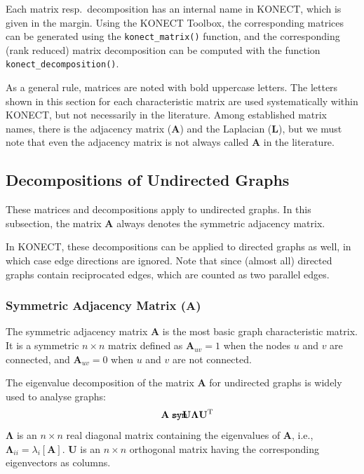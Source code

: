 \documentclass{article}
\def\mathnote#1{%
  \tag*{\rlap{\hspace\marginparsep\smash{\parbox[t]{\marginparwidth}{#1}}}}
}
\begin{document}
Each matrix resp.\ decomposition has an internal name in KONECT, which
is given in the margin.  Using the KONECT Toolbox, the corresponding
matrices can be generated using the \texttt{konect\_matrix()} function,
and the corresponding (rank reduced) matrix decomposition can be
computed with the function \texttt{konect\_decomposition()}. 

As a general rule, matrices are noted with bold uppercase letters.  The
letters shown in this section for each characteristic matrix are used
systematically within KONECT, but not necessarily in the literature.
Among established matrix names, there is the adjacency matrix ($\mathbf
A$) and the Laplacian ($\mathbf L$), but we must note that even the
adjacency matrix is not always called $\mathbf A$ in the literature.

\subsection{Decompositions of Undirected Graphs}
These matrices and decompositions apply to undirected graphs.  In this
subsection, the matrix $\mathbf A$ always denotes the symmetric
adjacency matrix. 

In KONECT, these decompositions can be applied to directed graphs as well, in
which case edge directions are ignored.  Note that since (almost all)
directed graphs contain reciprocated edges, which are counted as two
parallel edges. 

\subsubsection{Symmetric Adjacency Matrix ($\mathbf A$)}
The symmetric adjacency matrix $\mathbf A$ is the most basic graph
characteristic matrix.  It is a symmetric $n \times n$ matrix defined as
$\mathbf A_{uv}=1$ when the nodes $u$ and $v$ are connected, and
$\mathbf A_{uv}=0$ when $u$ and $v$ are not connected. 

The eigenvalue decomposition of the matrix $\mathbf A$ for undirected
graphs is widely used to analyse graphs: 
\begin{align}
  \mathnote{\texttt{sym}}
  \mathbf A &= \mathbf U \mathbf \Lambda \mathbf U^{\mathrm T}
\end{align}
$\mathbf \Lambda$ is an $n \times n$ real diagonal matrix containing the
eigenvalues of $\mathbf A$, i.e., $\mathbf \Lambda_{ii} =
\lambda_i[\mathbf A]$.  
$\mathbf U$ is an $n \times n$ orthogonal matrix having the
corresponding eigenvectors as columns. 
\end{document}
